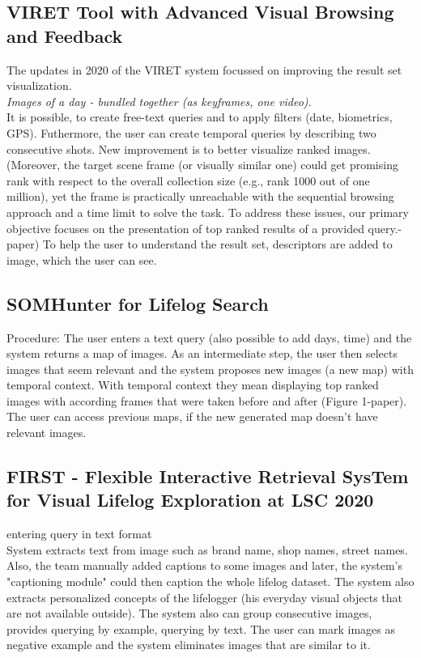 \subsection{VIRET Tool with Advanced Visual Browsing and Feedback}
The updates in  2020 of the VIRET system focussed on improving the result set visualization.\\
\textit{Images of a day - bundled together (as keyframes, one video).}\\
It is possible, to create free-text queries and to apply filters (date, biometrics, GPS). Futhermore, the user can create temporal queries by describing two consecutive shots. New improvement is to better visualize ranked images. (Moreover, the target scene frame (or visually similar one) could get promising rank with respect to the overall collection size (e.g., rank 1000 out of one million), yet the frame is practically unreachable with the sequential browsing approach and a time limit to solve the task. To address these issues, our primary objective focuses on the presentation of top ranked results of a provided query.-paper)
To help the user to understand the result set, descriptors are added to image, which the user can see.

\subsection{SOMHunter for Lifelog Search}
Procedure: The user enters a text query (also possible to add days, time) and the system returns a map of images. As an intermediate step, the user then selects images that seem relevant and the system proposes new images (a new map) with temporal context. With temporal context they mean displaying top ranked images with according frames that were taken before and after (Figure 1-paper). \\
The user can access previous maps, if the new generated map doesn't have relevant images. 

\subsection{FIRST - Flexible Interactive Retrieval SysTem for Visual Lifelog Exploration at LSC 2020}
entering query in text format\\
System extracts text from image such as brand name, shop names, street names. Also, the team manually added captions to some images and later, the system's "captioning module" could then caption the whole lifelog dataset. The system also extracts personalized concepts of the lifelogger (his everyday visual objects that are not available outside). The system also can group consecutive images, provides querying by example, querying by text. The user can mark images as negative example and the system  eliminates images that are similar to it.

